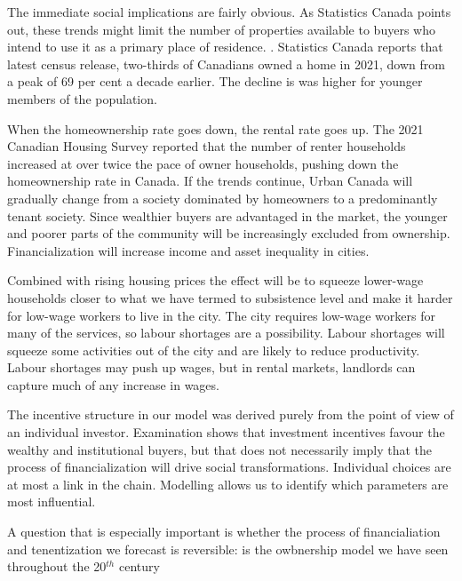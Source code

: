 The immediate social implications are fairly obvious. As Statistics Canada points out, these trends might limit the number of properties available to buyers who intend to use it as a primary place of residence. \cite{fontaineResidentialRealEstate2023}. Statistics Canada reports that latest census release, two-thirds of Canadians owned a home in 2021, down from a peak of 69 per cent a decade earlier. The decline is was higher for younger members of the population. 

When the homeownership rate goes down, the rental rate goes up. The 2021 Canadian Housing Survey reported that the number of renter households increased  at over twice the pace of owner households, pushing down the homeownership rate in Canada. If the trends continue, Urban Canada will gradually change from a society dominated by homeowners to a predominantly tenant society. Since wealthier buyers are advantaged in the market, the younger and poorer parts of the community will be increasingly excluded from ownership. Financialization will increase income and asset inequality in cities.

Combined with rising housing prices the effect will be to squeeze lower-wage households closer to what we have termed to subsistence level and make it harder for low-wage workers to live in the city. The city requires low-wage workers for many of the services, so labour shortages are a possibility. Labour shortages will squeeze some activities out of the city and are likely to reduce productivity. Labour shortages may push up wages, but in rental markets, landlords can capture much of any increase in wages. 

The incentive structure in our model was derived purely from the point of view of an individual investor. Examination shows that investment incentives favour the wealthy and institutional buyers, but that does not necessarily imply that the process of financialization will drive social transformations. Individual choices are at most  a link in the chain. Modelling  allows us to identify which parameters are most influential.

A question that is especially important is whether the process of financialiation and tenentization we forecast is reversible: is the owbnership model we have seen throughout the 20$^{th}$ century







